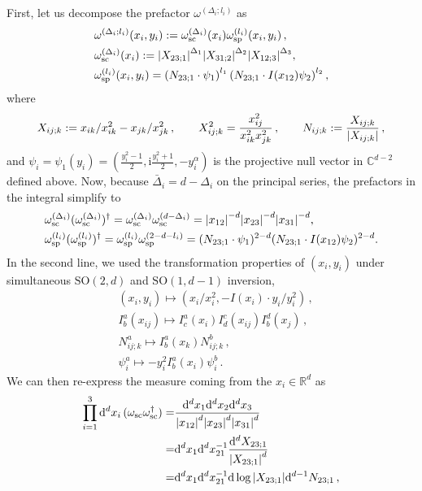 \documentclass{article}
\def \om {\omega}
\def \Dg {\Delta}
\def \ag {\alpha}
\def \Rs {\mathbb{R}}
\def \Cs {\mathbb{C}}
\begin{document}
First, let us decompose the prefactor $\om^{(\Dg_i;l_i)}$ as 
\begin{align}
& \om^{(\Dg_i;l_i)}(x_i,y_i):= \om^{(\Dg_i)}_{\mathrm{sc}}(x_i) \om^{(l_i)}_{\mathrm{sp}}(x_i,y_i)\,, \\
& \om^{(\Dg_i)}_{\mathrm{sc}}(x_i) := \abs{X_{23;1}}^{\Dg_1} \abs{X_{31;2}}^{\Dg_2} \abs{X_{12;3}}^{\Dg_3}, \\
& \om^{(l_i)}_{\mathrm{sp}}(x_i,y_i) = \left(N_{23;1} \cdot \psi_1 \right)^{l_1} \left(N_{23;1} \cdot I(x_{12}) \psi_2 \right)^{l_2},
\end{align}
where
\begin{equation}
X_{ij;k} := x_{ik}/x_{ik}^2 - x_{jk}/x_{jk}^2\,, \qquad X_{ij;k}^2 = \frac{x_{ij}^2}{x_{ik}^2 x_{jk}^2}\,, \qquad N_{ij;k} := \frac{X_{ij;k}}{\abs{X_{ij;k}}}\,, 
\end{equation}
and $\psi_i = \psi_1(y_i) = \left(\frac{y_i^2-1}{2}, \mathrm{i} \frac{y_i^2+1}{2}, -y_i^{\ag} \right)$ is the projective null vector in $\Cs^{d-2}$ defined above. Now, because $\bar{\Dg}_i = d-\Dg_i$ on the principal series, the prefactors in the integral simplify to
\begin{align}
&\om^{(\Dg_i)}_{\mathrm{sc}} (\om^{(\Dg_i)}_{\mathrm{sc}})^{\dagger} = \om_{\mathrm{sc}}^{(\Dg_i)} \om_{\mathrm{sc}}^{(d-\Dg_i)} = \abs{x_{12}}^{-d} \abs{x_{23}}^{-d} \abs{x_{31}}^{-d}, \\
& \om^{(l_i)}_{\mathrm{sp}} (\om^{(l_i)}_{\mathrm{sp}})^{\dagger} = \om^{(l_i)}_{\mathrm{sp}} \om^{(2-d-l_i)}_{\mathrm{sp}} = (N_{23;1} \cdot \psi_1)^{2-d} (N_{23;1} \cdot I(x_{12}) \psi_2)^{2-d}.
\end{align}
In the second line, we used the transformation properties of $(x_i,y_i)$ under simultaneous $\mathrm{SO}(2,d)$ and $\mathrm{SO}(1,d-1)$ inversion,
\begin{align*}
&(x_i,y_i) \mapsto (x_i/x_i^2, -I(x_i) \cdot y_i/y_i^2)\,, \\
& I^a_b(x_{ij}) \mapsto I^a_c(x_i) I^c_d(x_{ij}) I^d_b(x_j)\,, \\
& N_{ij;k}^a \mapsto I^a_b(x_k) N_{ij;k}^b\,, \\
& \psi_i^a \mapsto -y_i^2 I^a_b(x_i) \psi_i^b\,.
\end{align*}
We can then re-express the measure coming from the $x_i \in \Rs^{d}$ as
\begin{align*}
\prod_{i=1}^3 \dd^d x_i \, (\om_{\mathrm{sc}}  \om^{\dagger}_{\mathrm{sc}}) =& \frac{\dd^d x_1 \dd^d x_2 \dd^d x_3}{\abs{x_{12}}^d \abs{x_{23}}^d\abs{x_{31}}^d} \\
=& \dd^d x_1 \dd^d x_{21}^{-1} \frac{\dd^d X_{23;1}}{\abs{X_{23;1}}^d} \\
=&  \dd^d x_1 \dd^d x_{21}^{-1} \dd \log \abs{X_{23;1}} \dd^{d-1} N_{23;1}\,, 
\end{align*}
\end{document}
